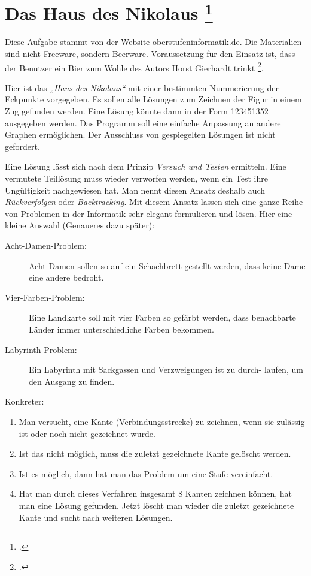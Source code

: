 \documentclass{lehramt-informatik-aufgabe}
\begin{document}

\section{Das Haus des Nikolaus
\footcite[Seite 2-3]{aud:ab:3}
}

\begin{exkurs}[Quelle]
Diese Aufgabe stammt von der Website oberstufeninformatik.de. Die
Materialien sind nicht Freeware, sondern Beerware. Voraussetzung für
den Einsatz ist, dass der Benutzer ein Bier zum Wohle des Autors Horst
Gierhardt trinkt \footcite{net:pdf:nikolaus}.
\end{exkurs}

\noindent
Hier ist das \emph{„Haus des Nikolaus“} mit einer bestimmten
Nummerierung der Eckpunkte vorgegeben. Es sollen alle Lösungen zum
Zeichnen der Figur in einem Zug gefunden werden. Eine Lösung könnte dann
in der Form 123451352 ausgegeben werden. Das Programm soll eine einfache
Anpassung an andere Graphen ermöglichen. Der Ausschluss von gespiegelten
Lösungen ist nicht gefordert.

Eine Lösung lässt sich nach dem Prinzip \emph{Versuch und Testen}
ermitteln. Eine vermutete Teillösung muss wieder verworfen werden, wenn
ein Test ihre Ungültigkeit nachgewiesen hat. Man nennt diesen Ansatz
deshalb auch \emph{Rückverfolgen} oder \emph{Backtracking}. Mit diesem
Ansatz lassen sich eine ganze Reihe von Problemen in der Informatik sehr
elegant formulieren und lösen. Hier eine kleine Auswahl (Genaueres dazu
später):

\begin{description}
\item[Acht-Damen-Problem:] Acht Damen sollen so auf ein Schachbrett
gestellt werden, dass keine Dame eine andere bedroht.

\item[Vier-Farben-Problem:] Eine Landkarte soll mit vier Farben so
gefärbt werden, dass benachbarte Länder immer unterschiedliche Farben
bekommen.

\item[Labyrinth-Problem:] Ein Labyrinth mit Sackgassen und Verzweigungen
ist zu durch- laufen, um den Ausgang zu finden.
\end{description}

\noindent
Konkreter:

\begin{enumerate}
\item Man versucht, eine Kante (Verbindungsstrecke) zu zeichnen, wenn
sie zulässig ist oder noch nicht gezeichnet wurde.

\item Ist das nicht möglich, muss die zuletzt gezeichnete Kante gelöscht
werden.

\item  Ist es möglich, dann hat man das Problem um eine Stufe
vereinfacht.

\item  Hat man durch dieses Verfahren insgesamt 8 Kanten zeichnen
können, hat man eine Lösung gefunden. Jetzt löscht man wieder die
zuletzt gezeichnete Kante und sucht nach weiteren Lösungen.
\end{enumerate}
\end{document}
